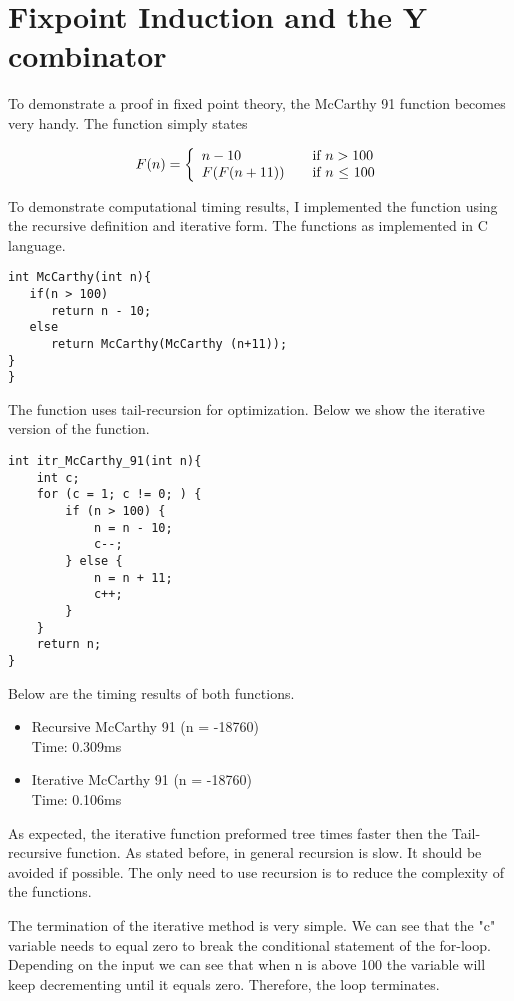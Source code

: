 \documentclass{article}
\begin{document}
\section{Fixpoint Induction and the Y combinator}

To demonstrate a proof in fixed point theory, the McCarthy 91 function becomes very handy. The function simply states 

\[
  F(n) = \left\{ 
  \begin{array}{l l}
    n-10 & \quad \text{if $n > 100$}\\
    F(F(n+11)) & \quad \text{if $n$ $\leq$ 100}\\
  \end{array} \right.
\]

To demonstrate computational timing results, I implemented the function using the recursive definition and iterative form. The functions as implemented in C language. 

\begin{lstlisting}
int McCarthy(int n){ 
   if(n > 100)
      return n - 10; 
   else
      return McCarthy(McCarthy (n+11));
}
}
\end{lstlisting}

The function uses tail-recursion for optimization. Below we show the iterative version of the function. 
\begin{lstlisting}
int itr_McCarthy_91(int n){ 
    int c;
    for (c = 1; c != 0; ) { 
        if (n > 100) {
            n = n - 10; 
            c--;
        } else {
            n = n + 11; 
            c++;
        }   
    }   
    return n;
}
\end{lstlisting}

Below are the timing results of both functions.
\begin{itemize}
\item Recursive McCarthy 91 (n = -18760) \\Time: 0.309ms
\item Iterative McCarthy 91 (n = -18760) \\Time: 0.106ms
\end{itemize}

As expected, the iterative function preformed tree times faster then the Tail-recursive function. As stated before, in general recursion is slow. It should be avoided if possible. The only need to use recursion is to reduce the complexity of the functions. 

The termination of the iterative method is very simple. We can see that the "c" variable needs to equal zero to break the conditional statement of the for-loop. Depending on the input we can see that when n is above 100 the variable will keep decrementing until it equals zero. Therefore, the loop terminates. 
\end{document}
